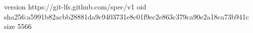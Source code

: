 version https://git-lfs.github.com/spec/v1
oid sha256:a5991b82acbb28881da9c9403731e8c01f9ec2e863c379ca90e2a18ca73b941c
size 5566
